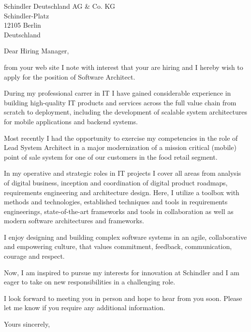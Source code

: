 \documentclass[10pt,a4paper]{dinbrief}
\date{\today}
\begin{document}
 
\begin{letter}  
{%
	Schindler Deutschland AG \& Co. KG\\
	Schindler-Platz\\
	12105 Berlin\\
	Deutschland
}
\subject{\bf Job Application Software Architect}
\opening{Dear Hiring Manager,}

from your web site I note with interest that your are hiring and I hereby wish to apply for the position of Software Architect. 

During my professional carrer in IT I have gained considerable experience in building high-quality IT products and services across the full value chain from scratch to deployment, including the development of scalable system architectures for mobile applications and backend systems. 

Most recently I had the opportunity to exercise my competencies in the role of Lead System Architect in a major modernization of a mission critical (mobile) point of sale system for one of our customers in the food retail segment. 

In my operative and strategic roles in IT projects I cover all areas from analysis of digital business, inception and coordination of digital product roadmaps, requirements engineering and architecture design. Here, I utilize a toolbox with methods and technologies, established techniques and tools in requirements engineerings, state-of-the-art frameworks and tools in collaboration as well as modern software architectures and frameworks.



I enjoy designing and building complex software systems in an agile, collaborative and empowering culture, that values commitment, feedback, communication, courage and respect. %

Now, I am inspired to pursue my interests for innovation at Schindler and I am eager to take on new responsibilities in a challenging role.

I look forward to meeting you in person and hope to hear from you soon. Please let me know if you require any additional information.

\closing{Yours sincerely,}
\end{letter}
\end{document}
